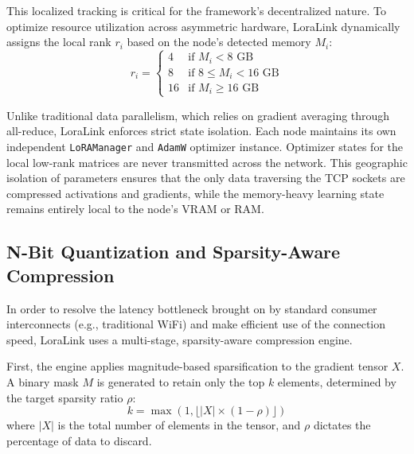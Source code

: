 \documentclass{ieeeaccess}
\begin{document}
This localized tracking is critical for the framework's decentralized nature. To optimize resource utilization across asymmetric hardware, LoraLink dynamically assigns the local rank $r_i$ based on the node's detected memory $M_i$:
\begin{equation}
r_i = \begin{cases}
4 & \text{if } M_i < 8 \text{ GB} \\
8 & \text{if } 8 \le M_i < 16 \text{ GB} \\
16 & \text{if } M_i \ge 16 \text{ GB}
\end{cases}
\end{equation}

Unlike traditional data parallelism, which relies on gradient averaging through all-reduce, LoraLink enforces strict state isolation. Each node maintains its own independent \texttt{LoRAManager} and \texttt{AdamW} optimizer instance. Optimizer states for the local low-rank matrices are never transmitted across the network. This geographic isolation of parameters ensures that the only data traversing the TCP sockets are compressed activations and gradients, while the memory-heavy learning state remains entirely local to the node's VRAM or RAM.

\subsection{N-Bit Quantization and Sparsity-Aware Compression}
\label{sec:compression}
In order to resolve the latency bottleneck brought on by standard consumer interconnects (e.g., traditional WiFi) and make efficient use of the connection speed, LoraLink uses a multi-stage, sparsity-aware compression engine.

First, the engine applies magnitude-based sparsification to the gradient tensor $X$. A binary mask $M$ is generated to retain only the top $k$ elements, determined by the target sparsity ratio $\rho$:
\begin{equation}
k = \max(1, \lfloor |X| \times (1 - \rho) \rfloor)
\end{equation}
where $|X|$ is the total number of elements in the tensor, and $\rho$ dictates the percentage of data to discard.
\end{document}
